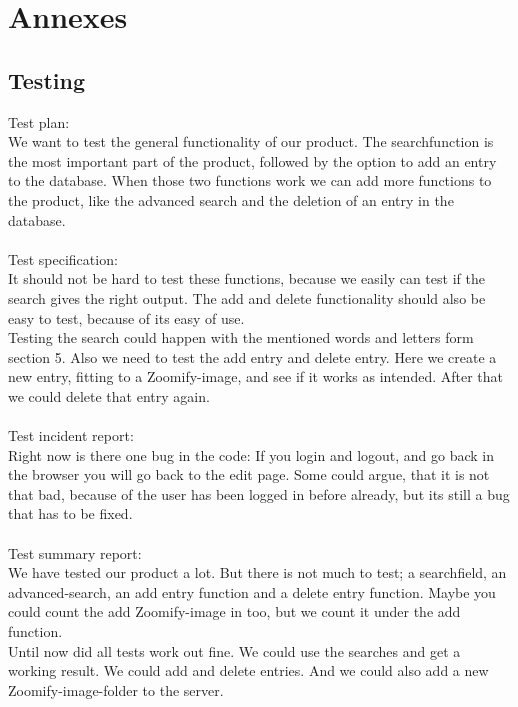 \documentclass[12pt,a4paper]{article}
\begin{document}
\section{Annexes}

\subsection{Testing}
Test plan: \\
We want to test the general functionality of our product. The searchfunction is the most important part of the product, followed by the option to add an entry to the database. When those two functions work we can add more functions to the product, like the advanced search and the deletion of an entry in the database.\\\\
Test specification:\\
It should not be hard to test these functions, because we easily can test if the search gives the right output. The add and delete functionality should also be easy to test, because of its easy of use.\\
Testing the search could happen with the mentioned words and letters form section 5. Also we need to test the add entry and delete entry. Here we create a new entry, fitting to a Zoomify-image, and see if it works as intended. After that we could delete that entry again.\\\\
Test incident report:\\
Right now is there one bug in the code: If you login and logout, and go back in the browser you will go back to the edit page. Some could argue, that it is not that bad, because of the user has been logged in before already, but its still a bug that has to be fixed.\\\\
Test summary report:\\
We have tested our product a lot. But there is not much to test; a searchfield, an advanced-search, an add entry function and a delete entry function. Maybe you could count the add Zoomify-image in too, but we count it under the add function.\\
Until now did all tests work out fine. We could use the searches and get a working result. We could add and delete entries. And we could also add a new Zoomify-image-folder to the server.
\end{document}
